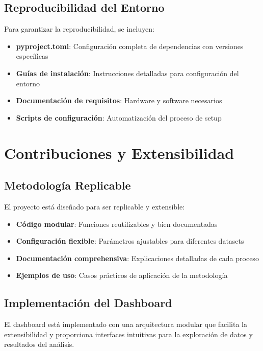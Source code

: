 \documentclass[12pt,a4paper,twoside,openany]{book}
\begin{document}
\subsection{Reproducibilidad del Entorno}

Para garantizar la reproducibilidad, se incluyen:

\begin{itemize}
    \item \textbf{pyproject.toml}: Configuración completa de dependencias con versiones específicas
    \item \textbf{Guías de instalación}: Instrucciones detalladas para configuración del entorno
    \item \textbf{Documentación de requisitos}: Hardware y software necesarios
    \item \textbf{Scripts de configuración}: Automatización del proceso de setup
\end{itemize}

\section{Contribuciones y Extensibilidad}

\subsection{Metodología Replicable}

El proyecto está diseñado para ser replicable y extensible:

\begin{itemize}
    \item \textbf{Código modular}: Funciones reutilizables y bien documentadas
    \item \textbf{Configuración flexible}: Parámetros ajustables para diferentes datasets
    \item \textbf{Documentación comprehensiva}: Explicaciones detalladas de cada proceso
    \item \textbf{Ejemplos de uso}: Casos prácticos de aplicación de la metodología
\end{itemize}

\subsection{Implementación del Dashboard}

El dashboard está implementado con una arquitectura modular que facilita la extensibilidad y proporciona interfaces intuitivas para la exploración de datos y resultados del análisis.
\end{document}
